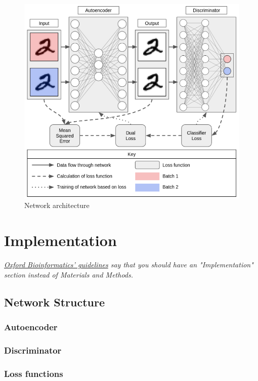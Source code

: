 \documentclass[titlepage]{article}
\begin{document}
\begin{figure}
	\centering
	\includegraphics[width=4.5in]{figures/network}
	\caption{Network architecture}
	\label{simulationfigure}
\end{figure}

\section{Implementation}

\emph{\href{https://bmcbioinformatics.biomedcentral.com/submission-guidelines/preparing-your-manuscript/software-article}{Oxford Bioinformatics' guidelines} say that you should have an "Implementation" section instead of Materials and Methods.}

\subsection{Network Structure}

\subsubsection{Autoencoder}

\subsubsection{Discriminator}

\subsubsection{Loss functions}
\end{document}
